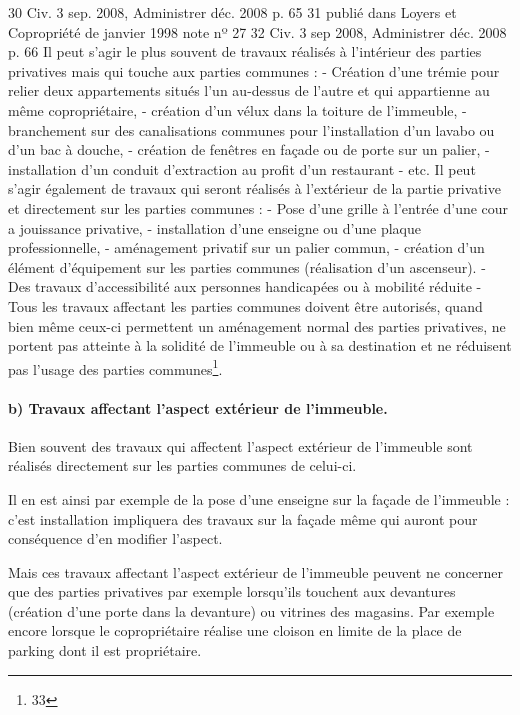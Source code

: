 			30 Civ. 3 sep. 2008, Administrer déc. 2008 p. 65
			31 publié dans Loyers et Copropriété de janvier 1998 note nº 27
			32 Civ. 3 sep 2008, Administrer déc. 2008 p. 66
				Il peut s'agir le plus souvent de travaux réalisés à l'intérieur des parties privatives mais qui touche aux parties communes :
				- Création d'une trémie pour relier deux appartements situés l'un au-dessus de l'autre et qui appartienne au même copropriétaire,
				- création d'un vélux dans la toiture de l'immeuble,
				- branchement sur des canalisations communes pour l'installation d'un lavabo ou d'un bac à douche,
				- création de fenêtres en façade ou de porte sur un palier,
				- installation d’un conduit d’extraction au profit d’un restaurant
				- etc.
				Il peut s'agir également de travaux qui seront réalisés à l'extérieur de la partie privative et directement sur les parties communes :
				- Pose d'une grille à l'entrée d'une cour a jouissance privative,
				- installation d'une enseigne ou d'une plaque professionnelle,
				- aménagement privatif sur un palier commun,
				- création d'un élément d'équipement sur les parties communes (réalisation d'un ascenseur).
				- Des travaux d'accessibilité aux personnes handicapées ou à mobilité réduite
				- \etc
				Tous les travaux affectant les parties communes doivent être autorisés, quand bien même ceux-ci permettent un aménagement normal des parties privatives, ne portent pas atteinte à la solidité de l’immeuble ou à sa destination et ne réduisent pas l’usage des parties communes\footnote{33}.
			
			\paragraph{b) Travaux affectant l’aspect extérieur de l’immeuble.}
				
				Bien souvent des travaux qui affectent l'aspect extérieur de l'immeuble sont réalisés directement sur les parties communes de celui-ci.
				
				Il en est ainsi par exemple de la pose d'une enseigne sur la façade de l'immeuble : c'est installation impliquera des travaux sur la façade même qui auront pour conséquence d'en modifier l'aspect.
				
				Mais ces travaux affectant l'aspect extérieur de l'immeuble peuvent ne concerner que des parties privatives par exemple lorsqu'ils touchent aux devantures (création d'une porte dans la devanture) ou vitrines des magasins. Par exemple encore lorsque le copropriétaire réalise une cloison en limite de la place de parking dont il est propriétaire.
				

